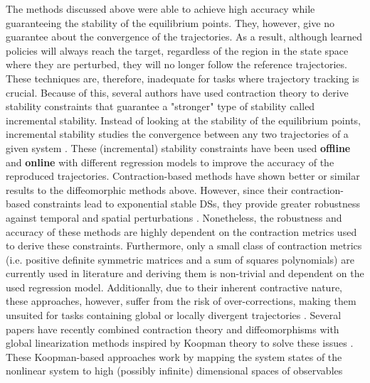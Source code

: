 The methods discussed above were able to achieve high accuracy while guaranteeing the stability of the equilibrium points. They, however, give no guarantee about the convergence of the trajectories. As a result, although learned policies will always reach the target, regardless of the region in the state space where they are perturbed, they will no longer follow the reference trajectories. These techniques are, therefore, inadequate for tasks where trajectory tracking is crucial. Because of this, several authors have used contraction theory to derive stability constraints that guarantee a "stronger" type of stability called incremental stability. Instead of looking at the stability of the equilibrium points, incremental stability studies the convergence between any two trajectories of a given system \cite{lohmillerContractionAnalysisNonlinear1998,tsukamotoContractionTheoryNonlinear2021}. These (incremental) stability constraints have been used \textbf{offline} \cite{ravichandarLearningContractingNonlinear2016,ravichandarLearningStableNonlinear2018,khadirTeleoperatorImitationContinuoustime2019,sindhwaniLearningContractingVector2018,ravichandarLearningPositionOrientation2019} and \textbf{online} \cite{blocherLearningStableDynamical2017} with different regression models to improve the accuracy of the reproduced trajectories. Contraction-based methods have shown better or similar results to the diffeomorphic methods above. However, since their contraction-based constraints lead to exponential stable DSs, they provide greater robustness against temporal and spatial perturbations \cite{ravichandarLearningPartiallyContracting2017}. Nonetheless, the robustness and accuracy of these methods are highly dependent on the contraction metrics used to derive these constraints. Furthermore, only a small class of contraction metrics (i.e. positive definite symmetric matrices and a sum of squares polynomials) are currently used in literature and deriving them is non-trivial and dependent on the used regression model. Additionally, due to their inherent contractive nature, these approaches, however, suffer from the risk of over-corrections, making them unsuited for tasks containing global or locally divergent trajectories \cite{figueroafernandezPhysicallyconsistentBayesianNonparametric2018,figueroaLocallyActiveGlobally2022}. Several papers have recently combined contraction theory and diffeomorphisms with global linearization methods inspired by Koopman theory to solve these issues \cite{bevandaKoopmanOperatorDynamical2021}. These Koopman-based approaches work by mapping the system states of the nonlinear system to high (possibly infinite) dimensional spaces of observables
